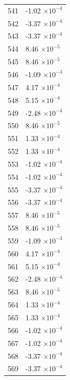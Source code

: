 \documentclass[a4paper,11pt]{article}
\begin{document}
\begin{center}
\begin{longtable}{|R{1.5cm}|R{2.5cm}|}
  541 &        -1.02 $\times 10^{          -4}$ \\
  542 &        -3.37 $\times 10^{          -4}$ \\
  543 &        -3.37 $\times 10^{          -4}$ \\
  544 &         8.46 $\times 10^{          -5}$ \\
  545 &         8.46 $\times 10^{          -5}$ \\
  546 &        -1.09 $\times 10^{          -3}$ \\
  547 &         4.17 $\times 10^{          -4}$ \\
  548 &         5.15 $\times 10^{          -4}$ \\
  549 &        -2.48 $\times 10^{          -4}$ \\
  550 &         8.46 $\times 10^{          -5}$ \\
  551 &         1.33 $\times 10^{          -4}$ \\
  552 &         1.33 $\times 10^{          -4}$ \\
  553 &        -1.02 $\times 10^{          -4}$ \\
  554 &        -1.02 $\times 10^{          -4}$ \\
  555 &        -3.37 $\times 10^{          -4}$ \\
  556 &        -3.37 $\times 10^{          -4}$ \\
  557 &         8.46 $\times 10^{          -5}$ \\
  558 &         8.46 $\times 10^{          -5}$ \\
  559 &        -1.09 $\times 10^{          -3}$ \\
  560 &         4.17 $\times 10^{          -4}$ \\
  561 &         5.15 $\times 10^{          -4}$ \\
  562 &        -2.48 $\times 10^{          -4}$ \\
  563 &         8.46 $\times 10^{          -5}$ \\
  564 &         1.33 $\times 10^{          -4}$ \\
  565 &         1.33 $\times 10^{          -4}$ \\
  566 &        -1.02 $\times 10^{          -4}$ \\
  567 &        -1.02 $\times 10^{          -4}$ \\
  568 &        -3.37 $\times 10^{          -4}$ \\
  569 &        -3.37 $\times 10^{          -4}$ \\

\end{longtable}
\end{center}
\end{document}
